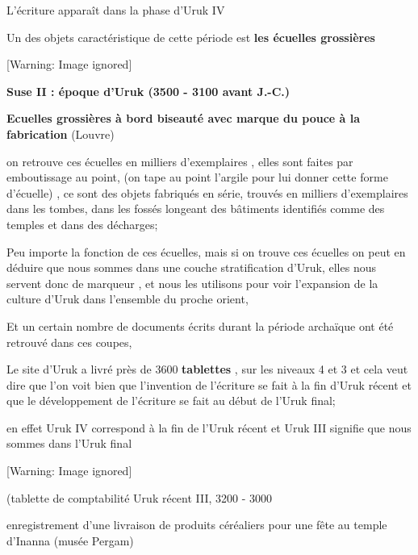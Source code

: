 \documentclass[a4paper,10pt]{article}
\begin{document}
\begin{itemize}
L'écriture apparaît dans la phase
d'Uruk IV

Un des objets caractéristique de cette période est \textbf{les écuelles
grossières}

\newline


\begin{center}
 [Warning: Image ignored] %

\end{center}
\textbf{\textcolor[rgb]{0.18039216,0.18039216,0.18039216}{Suse II :
époque d'Uruk (3500 - 3100 avant J.-C.)}} 

\textbf{\textcolor[rgb]{0.18039216,0.18039216,0.18039216}{Ecuelles
grossières à bord biseauté avec marque du pouce à la fabrication}} 
(Louvre)

on retrouve ces écuelles en milliers d'exemplaires ,
elles sont faites par emboutissage au point,  (on tape au point
l'argile pour lui donner cette forme
d'écuelle) , ce sont des objets fabriqués en série,
trouvés en milliers d'exemplaires dans les tombes,
dans les fossés longeant des bâtiments identifiés comme des temples et
dans des décharges;

Peu importe la fonction de ces écuelles, mais si on trouve ces écuelles
on peut en déduire que nous sommes dans une couche stratification
d'Uruk, elles nous servent donc de marqueur , et nous
les utilisons pour voir l'expansion de la culture
d'Uruk dans l'ensemble du proche
orient, 

Et un certain nombre de documents écrits durant la période archaïque ont
été retrouvé dans ces coupes, 

Le site d'Uruk a livré près de 3600 \textbf{tablettes}
, sur les  niveaux 4 et 3 et cela veut dire que l'on
voit bien que l'invention de
l'écriture se fait à la fin d'Uruk
récent et que le développement de l'écriture se fait
au début de l'Uruk final;

en effet Uruk IV correspond à la fin de l'Uruk récent
et Uruk III signifie que nous sommes dans l'Uruk final

  [Warning: Image ignored] %
 

(tablette de comptabilité Uruk récent III, 3200 - 3000

enregistrement d'une livraison de produits céréaliers
pour une fête au temple d'Inanna (musée Pergam)


\end{itemize}
\end{document}
